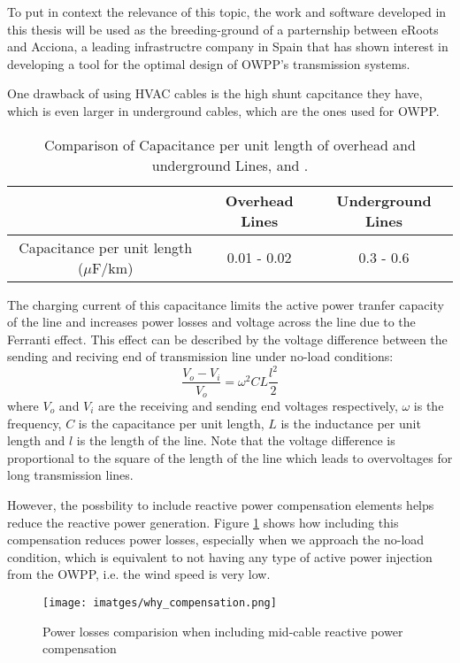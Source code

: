 \documentclass[a4paper,11pt, titlepage, twoside]{article}
\begin{document}
To put in context the relevance of this topic, the work and software developed in this thesis will be used
as the breeding-ground of a parternship between eRoots and Acciona, a leading infrastructre company in Spain that has shown interest in developing a tool for the optimal design
of OWPP's transmission systems.

One drawback of using HVAC cables is the high shunt capcitance they have, which is even larger in underground cables,
which are the ones used for OWPP.

\begin{table}[h]
    \centering
    \begin{tabular}{|c|c|c|}
    \hline
     & Overhead Lines & Underground Lines \\
     \hline
    Capacitance per unit length ($\mu$F/km) & 0.01 - 0.02  & 0.3 - 0.6 \\
    \hline
    \end{tabular}
    \caption{Comparison of Capacitance per unit length of overhead and underground Lines, \cite{ABB} and \cite{overhead}. }
    \label{tab:capacitance_comparison}
    \end{table}

The charging current of this capacitance limits the active power tranfer capacity of the line and increases
power losses and voltage across the line due to the Ferranti effect\cite{ferranti}. This effect can be described by the voltage difference between the sending and reciving end of transmission line under no-load conditions:
\begin{equation}
    \frac{V_{o} - V_{i}}{V_{o}} = \omega^2CL\frac{l^2}{2}
\end{equation}
where $V_{o}$ and $V_{i}$ are the receiving and sending end voltages respectively, $\omega$ is the frequency, $C$ is the capacitance per unit length, $L$ is the inductance per unit length and $l$ is the length of the line. Note that the voltage difference is
proportional to the square of the length of the line which leads to overvoltages for long transmission lines.\par

However, the possbility to include reactive power compensation elements helps reduce the reactive power generation. Figure \ref{fig:whycomp} shows how including
this compensation reduces power losses, especially when we approach the no-load condition, which is equivalent to not having any type of active power injection from
the OWPP, i.e. the wind speed is very low.
\begin{figure}[h] %
	\centering
	\texttt{[image: imatges/why\_compensation.png]}
	\caption{Power losses comparision when including mid-cable reactive power compensation}
	\label{fig:whycomp} %
\end{figure}
\end{document}
